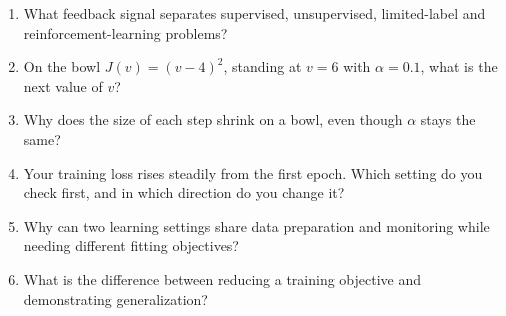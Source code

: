 \begin{quickcheck}
\begin{enumerate}
  \item What feedback signal separates supervised, unsupervised, limited-label and reinforcement-learning problems?
  \item On the bowl $J(v)=(v-4)^2$, standing at $v=6$ with $\alpha=0.1$, what is the next value of $v$?
  \item Why does the size of each step shrink on a bowl, even though $\alpha$ stays the same?
  \item Your training loss rises steadily from the first epoch. Which setting do you check first, and in which direction do you change it?
  \item Why can two learning settings share data preparation and monitoring while needing different fitting objectives?
  \item What is the difference between reducing a training objective and demonstrating generalization?
\end{enumerate}
\end{quickcheck}
